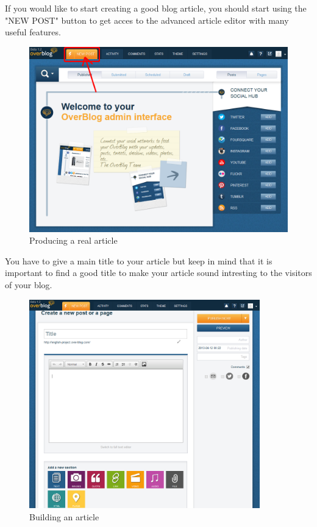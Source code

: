 \documentclass[a4paper,10pt]{article}
\begin{document}
If you would like to start creating a good blog article, you should start using the "NEW POST" button to get acces to the advanced article editor with many useful features. 

\begin{figure}[H]
    \center
	\includegraphics[width=12cm]{Images/newpostbutton001.png}
    \caption{Producing a real article}
\end{figure}

You have to give a main title to your article but keep in mind that it is important to find a good title to make your article sound intresting to the visitors of your blog. 

\begin{figure}[H]
    \center
	\includegraphics[width=10cm]{Images/article001.png}
    \caption{Building an article}
\end{figure}
\end{document}

